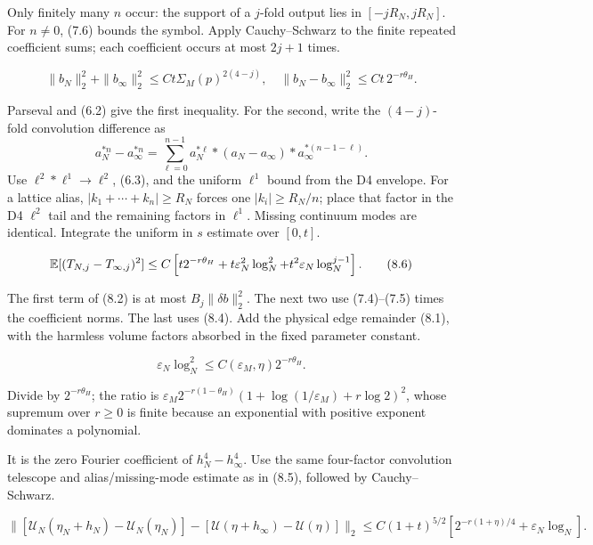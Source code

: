 \documentclass[11pt,a4paper]{article}
\newcommand{\eps}{\varepsilon}
\newcommand{\U}{\mathcal U}
\begin{document}
\Because Only finitely many $n$ occur: the support of a $j$-fold output lies in
$[-jR_N,jR_N]$.  For $n\ne0$, (7.6) bounds the symbol.  Apply Cauchy--Schwarz to
the finite repeated coefficient sums; each coefficient occurs at most $2j+1$ times.

\[
 \|b_N\|_2^2+\|b_\infty\|_2^2\le C t\Sigma_M(p)^{2(4-j)},\quad
 \|b_N-b_\infty\|_2^2\le Ct\,2^{-r\theta_H}.\tag{8.5}
\]

\Because Parseval and (6.2) give the first inequality.  For the second, write the
$(4-j)$-fold convolution difference as
\[
 a_N^{*n}-a_\infty^{*n}
 =\sum_{\ell=0}^{n-1}a_N^{*\ell}*(a_N-a_\infty)*a_\infty^{*(n-1-\ell)}.
\]
Use $\ell^2*\ell^1\to\ell^2$, (6.3), and the uniform $\ell^1$ bound from the
D4 envelope.  For a lattice alias, $|k_1+\cdots+k_n|\ge R_N$ forces one
$|k_i|\ge R_N/n$; place that factor in the D4 $\ell^2$ tail and the remaining
factors in $\ell^1$.  Missing continuum modes are identical.  Integrate the uniform
in $s$ estimate over $[0,t]$.

\[
 \E[(T_{N,j}-T_{\infty,j})^2]
 \le C\left[t2^{-r\theta_H}+t\eps_N^2\log_N^2
 +t^2\eps_N\log_N^{j-1}\right].\tag{8.6}
\]

\Because The first term of (8.2) is at most $B_j\|\delta b\|_2^2$.  The next
two use (7.4)--(7.5) times the coefficient norms.  The last uses (8.4).  Add the
physical edge remainder (8.1), with the harmless volume factors absorbed in the fixed
parameter constant.

\LS{2}{6}{Since $\eps_N=\eps_M2^{-r}$ and $\theta_H<1$,}
\[
 \eps_N\log_N^2\le C(\eps_M,\eta)2^{-r\theta_H}.\tag{8.7}
\]

\Because Divide by $2^{-r\theta_H}$; the ratio is
$\eps_M2^{-r(1-\theta_H)}(1+\log(1/\eps_M)+r\log2)^2$, whose supremum over
$r\ge0$ is finite because an exponential with positive exponent dominates a polynomial.


\Because It is the zero Fourier coefficient of $h_N^4-h_\infty^4$.  Use the same
four-factor convolution telescope and alias/missing-mode estimate as in (8.5), followed
by Cauchy--Schwarz.

\[
 \|[\U_N(\eta_N+h_N)-\U_N(\eta_N)]
 -[\U(\eta+h_\infty)-\U(\eta)]\|_2
 \le C(1+t)^{5/2}\left[2^{-r(1+\eta)/4}+\eps_N\log_N\right].
\tag{8.8}
\]
\end{document}
